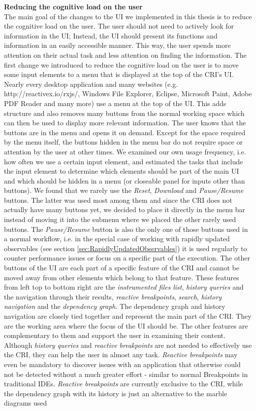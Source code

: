 \noindent\textbf{Reducing the cognitive load on the user}\\
The main goal of the changes to the UI we implemented in this thesis is to reduce the cognitive load on the user. The user should not need to actively look for information in the UI; Instead, the UI should present its functions and information in an easily accessible manner. This way, the user spends more attention on their actual task and less attention on finding the information. The first change we introduced to reduce the cognitive load on the user is to move some input elements to a menu that is displayed at the top of the CRI's UI. Nearly every desktop application and many websites (e.g. http://reactivex.io/rxjs/, Windows File Explorer, Eclipse, Microsoft Paint, Adobe PDF Reader and many more) use a menu at the top of the UI. This adds structure and also removes many buttons from the normal working space which can then be used to display more relevant information. The user knows that the buttons are in the menu and opens it on demand. Except for the space required by the menu itself, the buttons hidden in the menu bar do not require space or attention by the user at other times. We examined our own usage frequency, i.e. how often we use a certain input element, and estimated the tasks that include the input element to determine which elements should be part of the main UI and which should be hidden in a menu (or closeable panel for inputs other than buttons). We found that we rarely use the \emph{Reset}, \emph{Download} and \emph{Pause/Resume} buttons. The latter was used most among them and since the CRI does not actually have many buttons yet, we decided to place it directly in the menu bar instead of moving it into the submenu where we placed the other rarely used buttons. The \emph{Pause/Resume} button is also the only one of those buttons used in a normal workflow, i.e. in the special case of working with rapidly updated observables (see section \ref{sec:RapidlyUpdatedObservables}) it is used regularly to counter performance issues or focus on a specific part of the execution. The other buttons of the UI are each part of a specific feature of the CRI and cannot be moved away from other elements which belong to that feature. These features from left top to bottom right are the \emph{instrumented files list}, \emph{history queries} and the navigation through their results, \emph{reactive breakpoints}, \emph{search}, \emph{history navigation} and the \emph{dependency graph}. The dependency graph and history navigation are closely tied together and represent the main part of the CRI. They are the working area where the focus of the UI should be. The other features are complementary to them and support the user in examining their content. Although \emph{history queries} and \emph{reactive breakpoints} are not needed to effectively use the CRI, they can help the user in almost any task. \emph{Reactive breakpoints} may even be mandatory to discover issues with an application that otherwise could not be detected without a much greater effort - similar to normal Breakpoints in traditional IDEs. \emph{Reactive breakpoints} are currently exclusive to the CRI, while the dependency graph with its history is just an alternative to the marble diagrams used 